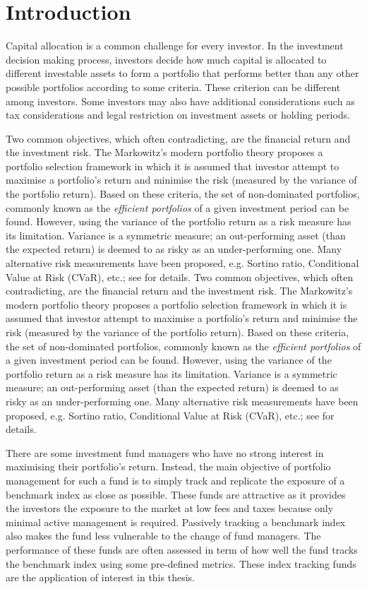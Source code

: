 \chapter{Introduction}
\graphicspath{{Chapter1/figures/}}
\label{Introduction}
Capital allocation is a common challenge for every investor. In the investment decision making process, investors decide how much capital is allocated to different investable assets to form a portfolio that performs better than any other possible portfolios according to some criteria. These criterion can be different among investors. Some investors may also have additional considerations such as tax considerations and legal restriction on investment assets or holding periods.

Two common objectives, which often contradicting, are the financial return and the investment risk. The Markowitz's modern portfolio theory \cite{HM52} proposes a portfolio selection framework in which it is assumed that investor attempt to maximise a portfolio's return and minimise the risk (measured by the variance of the portfolio return). Based on these criteria, the set of non-dominated portfolios, commonly known as the \emph{efficient portfolios} of a given investment period can be found. However, using the variance of the portfolio return as a risk measure has its limitation. Variance is a symmetric measure; an out-performing asset (than the expected return) is deemed to as risky as an under-performing one. Many alternative risk measurements have been proposed, e.g. Sortino ratio, Conditional Value at Risk (CVaR), etc.; see \cite{RTR00} for details.
Two common objectives, which often contradicting, are the financial return and the investment risk. The Markowitz's modern portfolio theory \cite{HM52} proposes a portfolio selection framework in which it is assumed that investor attempt to maximise a portfolio's return and minimise the risk (measured by the variance of the portfolio return). Based on these criteria, the set of non-dominated portfolios, commonly known as the \emph{efficient portfolios} of a given investment period can be found. However, using the variance of the portfolio return as a risk measure has its limitation. Variance is a symmetric measure; an out-performing asset (than the expected return) is deemed to as risky as an under-performing one. Many alternative risk measurements have been proposed, e.g. Sortino ratio, Conditional Value at Risk (CVaR), etc.; see \cite{RTR00} for details.

There are some investment fund managers who have no strong interest in maximising their portfolio's return. Instead, the main objective of portfolio management for such a fund is to simply track and replicate the exposure of a benchmark index as close as possible. These funds are attractive as it provides the investors the exposure to the market at low fees and taxes because only minimal active management is required. Passively tracking a benchmark index also makes the fund less vulnerable to the change of fund managers. The performance of these funds are often assessed in term of how well the fund tracks the benchmark index using some pre-defined metrics. These index tracking funds are the application of interest in this thesis.

